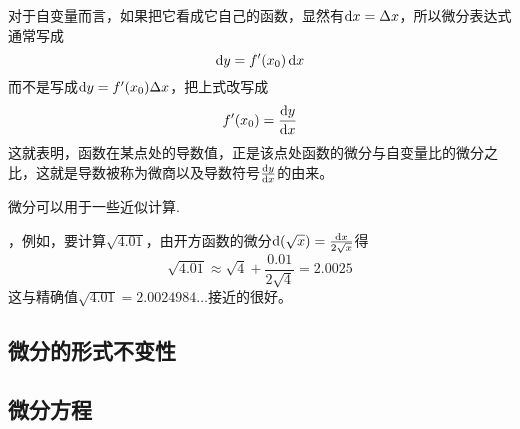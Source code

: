 对于自变量而言，如果把它看成它自己的函数，显然有$\mathop{}\!\mathrm{d} x = \Delta x$，所以微分表达式通常写成
\[ \mathop{}\!\mathrm{d} y = f'(x_0) \mathop{}\!\mathrm{d} x \]
而不是写成$\mathop{}\!\mathrm{d} y = f'(x_0) \Delta x$，把上式改写成
\[ f'(x_0) = \frac{\mathop{}\!\mathrm{d} y}{\mathop{}\!\mathrm{d} x} \]
这就表明，函数在某点处的导数值，正是该点处函数的微分与自变量比的微分之比，这就是导数被称为微商以及导数符号$\frac{\mathop{}\!\mathrm{d} y}{\mathop{}\!\mathrm{d} x}$的由来。

微分可以用于一些近似计算.

\begin{example}
  ，例如，要计算$\sqrt{4.01}$，由开方函数的微分$\mathop{}\!\mathrm{d} (\sqrt{x})=\frac{\mathop{}\!\mathrm{d} x}{2 \sqrt{x}}$得
  \[ \sqrt{4.01} \approx \sqrt{4} + \frac{0.01}{2 \sqrt{4}} = 2.0025 \]
  这与精确值$\sqrt{4.01}=2.0024984\ldots$接近的很好。
\end{example}

\subsection{微分的形式不变性}
\label{sec:the-non-variabriant-format-of-differtial}

\subsection{微分方程}
\label{sec:differtial-equation}





